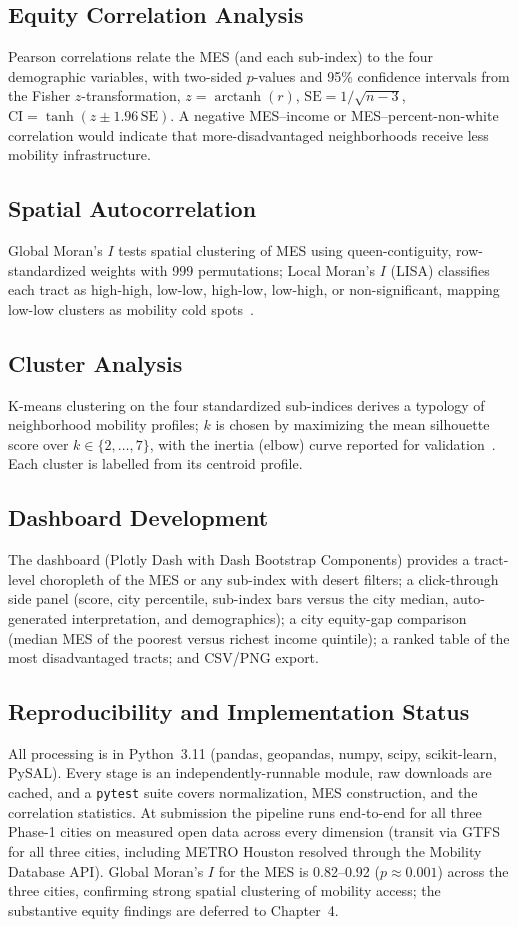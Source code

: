 \documentclass[11pt]{article}
\begin{document}
\subsection{Equity Correlation Analysis}
Pearson correlations relate the MES (and each sub-index) to the four demographic
variables, with two-sided $p$-values and 95\% confidence intervals from the
Fisher $z$-transformation, $z=\operatorname{arctanh}(r)$,
$\mathrm{SE}=1/\sqrt{n-3}$, $\mathrm{CI}=\tanh(z\pm 1.96\,\mathrm{SE})$. A negative
MES--income or MES--percent-non-white correlation would indicate that
more-disadvantaged neighborhoods receive less mobility infrastructure.

\subsection{Spatial Autocorrelation}
Global Moran's $I$ tests spatial clustering of MES using queen-contiguity,
row-standardized weights with 999 permutations; Local Moran's $I$ (LISA)
classifies each tract as high-high, low-low, high-low, low-high, or
non-significant, mapping low-low clusters as mobility cold spots~\cite{anselin1995}.

\subsection{Cluster Analysis}
K-means clustering on the four standardized sub-indices derives a typology of
neighborhood mobility profiles; $k$ is chosen by maximizing the mean silhouette
score over $k\in\{2,\dots,7\}$, with the inertia (elbow) curve reported for
validation~\cite{rousseeuw1987}. Each cluster is labelled from its centroid
profile.

\subsection{Dashboard Development}
The dashboard (Plotly Dash with Dash Bootstrap Components) provides a tract-level
choropleth of the MES or any sub-index with desert filters; a click-through side
panel (score, city percentile, sub-index bars versus the city median,
auto-generated interpretation, and demographics); a city equity-gap comparison
(median MES of the poorest versus richest income quintile); a ranked table of the
most disadvantaged tracts; and CSV/PNG export.

\subsection{Reproducibility and Implementation Status}
All processing is in Python~3.11 (pandas, geopandas, numpy, scipy, scikit-learn,
PySAL). Every stage is an independently-runnable module, raw downloads are cached,
and a \texttt{pytest} suite covers normalization, MES construction, and the
correlation statistics. At submission the pipeline runs end-to-end for all three
Phase-1 cities on measured open data across every dimension (transit via GTFS for
all three cities, including METRO Houston resolved through the Mobility Database
API). Global Moran's $I$ for the MES is 0.82--0.92 ($p\approx 0.001$) across the
three cities, confirming strong spatial clustering of mobility access; the
substantive equity findings are deferred to Chapter~4.
\end{document}
